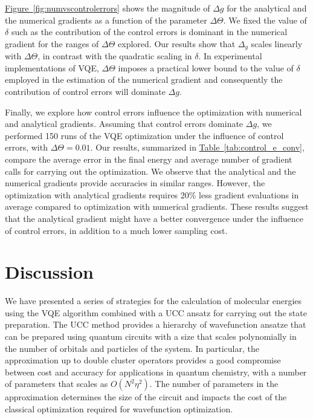 \documentclass[superscriptaddress,aps,pra,twocolumn,nofootinbib,babel]{revtex4-1}
\newcommand{\tab}[1]{\hyperref[tab:#1]{Table~\ref*{tab:#1}}}
\newcommand{\fig}[1]{\hyperref[fig:#1]{Figure~\ref*{fig:#1}}}
\begin{document}
{\fig{numvscontrolerrors} shows the magnitude of $\Delta g$ for the analytical and the numerical gradients as a function of the parameter $\Delta \Theta$. We fixed the value of $\delta$ such as the contribution of the control errors is dominant in the numerical gradient for the ranges of $\Delta\Theta$ explored. Our results show that $\Delta_g$ scales linearly with $\Delta \Theta$, in contrast with the quadratic scaling in $\delta$. In experimental implementations of VQE, $\Delta \Theta$ imposes a practical lower bound to the value of $\delta$ employed in the estimation of the numerical gradient and consequently the contribution of control errors will dominate $\Delta g$. 

Finally, we explore how control errors influence the optimization with numerical and analytical gradients. Assuming that control errors dominate $\Delta g$, we performed 150 runs of the VQE optimization under the influence of control errors, with $\Delta\Theta=0.01$. Our results, summarized in \tab{control_e_conv}, compare the average error in the final energy and average number of gradient calls for carrying out the optimization. We observe that the analytical and the numerical gradients provide accuracies in similar ranges. However, the optimization with analytical gradients requires 20\% less gradient evaluations in average compared to optimization with numerical gradients. These results suggest that the analytical gradient might have a better convergence under the influence of control errors, in addition to a much lower sampling cost.
}

\section{Discussion}\label{sec:discussion}

We have presented a series of strategies for the calculation of molecular energies using the VQE algorithm combined with a UCC ansatz for carrying out the state preparation. The UCC method provides a hierarchy of wavefunction ansatze that can be prepared using quantum circuits with a size that scales polynomially in the number of orbitals and particles of the system. In particular, the approximation up to double cluster operators provides a good compromise between cost and accuracy for applications in quantum  chemistry, with a number of parameters that scales as $O(N^2\eta^2)$. The number of parameters in the approximation determines the size of the circuit and impacts the cost of the classical optimization required for wavefunction optimization. 
\end{document}
